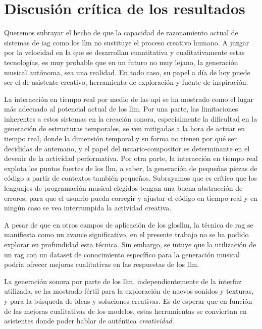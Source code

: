 \begin{enumerate}
\end{enumerate}


\section{Discusión crítica de los resultados}

Queremos subrayar el hecho de que la capacidad de razonamiento actual de sistemas de \gls{iag} como los \gls{llm} no sustituye el proceso creativo humano. A juzgar por la velocidad en la que se desarrollan cuantitativa y cualitativamente estas tecnologías, es muy probable que en un futuro no muy lejano, la generación musical autónoma, sea una realidad. En todo caso, su papel a día de hoy puede ser el de asistente creativo, herramienta de exploración y fuente de inspiración.

La interacción en tiempo real por medio de las \gls{api} se ha mostrado como el lugar más adecuado al potencial actual de los \gls{llm}. Por una parte, las limitaciones inherentes a estos sistemas en la creación sonora, especialmente la dificultad en la generación de estructuras temporales, se ven mitigadas a la hora de actuar en tiempo real, donde la dimensión temporal y su forma no tienen por qué ser decididas de antemano, y el papel del usuario-compositor es determinante en el devenir de la actividad performativa. Por otra parte, la interacción en tiempo real explota los puntos fuertes de los \gls{llm}, a saber, la generación de pequeñas piezas de código a partir de contextos también pequeños. Subrayamos que es crítico que los lenguajes de programación musical elegidos tengan una buena abstracción de errores, para que el usuario pueda corregir y ajustar el código en tiempo real y en ningún caso se vea interrumpida la actividad creativa.

A pesar de que en otros campos de aplicación de los glos{llm}, la técnica de \gls{rag} se manifiesta como un avance significativo, en el presente trabajo no se ha podido explorar en profundidad esta técnica. Sin embargo, se intuye que la utilización de un \gls{rag} con un dataset de conocimiento específico para la generación musical podría ofrecer mejoras cualitativas en las respuestas de los \gls{llm}.

La generación sonora por parte de los \gls{llm}, independientemente de la interfaz utilizada, se ha mostrado fértil para la exploración de nuevos sonidos y texturas, y para la búsqueda de ideas y soluciones creativas. Es de esperar que en función de las mejoras cualitativas de los modelos, estas herramientas se conviertan en asistentes donde poder hablar de auténtica \emph{creatividad}. 


